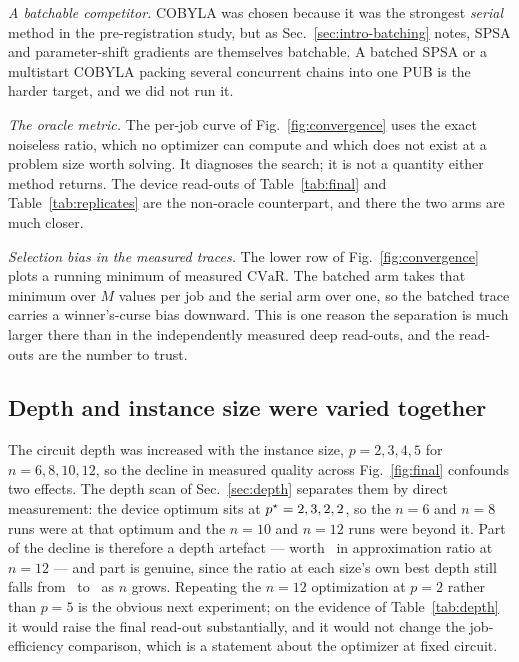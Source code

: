 \documentclass[aps,prx,preprint,superscriptaddress,nofootinbib,longbibliography]{revtex4-2}
\newcommand{\CVaR}{\mathrm{CVaR}}
\begin{document}
\emph{A batchable competitor.} COBYLA was chosen because it was the strongest \emph{serial}
method in the pre-registration study, but as Sec.~\ref{sec:intro-batching} notes, SPSA and
parameter-shift gradients are themselves batchable. A batched SPSA or a multistart COBYLA packing
several concurrent chains into one PUB is the harder target, and we did not run it.

\emph{The oracle metric.} The per-job curve of Fig.~\ref{fig:convergence} uses the exact
noiseless ratio, which no optimizer can compute and which does not exist at a problem size worth
solving. It diagnoses the search; it is not a quantity either method returns. The device
read-outs of Table~\ref{tab:final} and Table~\ref{tab:replicates} are the non-oracle
counterpart, and there the two arms are much closer.

\emph{Selection bias in the measured traces.} The lower row of Fig.~\ref{fig:convergence} plots
a running minimum of measured $\CVaR$. The batched arm takes that minimum over $M$ values per
job and the serial arm over one, so the batched trace carries a winner's-curse bias downward.
This is one reason the separation is much larger there than in the independently measured deep
read-outs, and the read-outs are the number to trust.

\subsection{Depth and instance size were varied together}

The circuit depth was increased with the instance size, $p = 2,3,4,5$ for $n = 6,8,10,12$, so the
decline in measured quality across Fig.~\ref{fig:final} confounds two effects. The depth scan of
Sec.~\ref{sec:depth} separates them by direct measurement: the device optimum sits at
$p^\star = 2, 3, 2, 2$, so the $n = 6$ and $n = 8$ runs were
at that optimum and the $n = 10$ and $n = 12$ runs were beyond it. Part of the decline is therefore
a depth artefact --- worth \depthgaintwelve\ in approximation ratio at $n=12$ --- and part is
genuine, since the ratio at each size's own best depth still falls from \depthbestsix\ to
\depthbesttwelve\ as $n$ grows. Repeating the $n=12$ optimization at $p=2$ rather than $p=5$ is
the obvious next experiment; on the evidence of Table~\ref{tab:depth} it would raise the final
read-out substantially, and it would not change the job-efficiency comparison, which is a
statement about the optimizer at fixed circuit.
\end{document}
